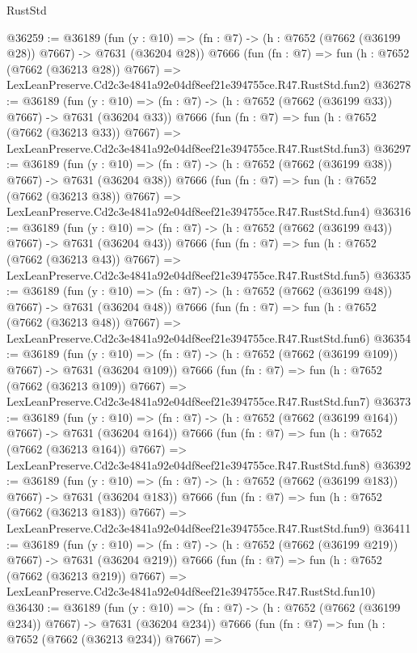 \begin{lexlean}{RustStd}
\begin{coremodule}
@36259 := @36189
    (fun (y : @10) => (fn : @7) -> (h : @7652 (@7662 (@36199 @28)) @7667) -> @7631 (@36204 @28))
    @7666
    (fun (fn : @7) =>
    fun (h : @7652 (@7662 (@36213 @28)) @7667) =>
    LexLeanPreserve.Cd2c3e4841a92e04df8eef21e394755ce.R47.RustStd.fun2)
@36278 := @36189
    (fun (y : @10) => (fn : @7) -> (h : @7652 (@7662 (@36199 @33)) @7667) -> @7631 (@36204 @33))
    @7666
    (fun (fn : @7) =>
    fun (h : @7652 (@7662 (@36213 @33)) @7667) =>
    LexLeanPreserve.Cd2c3e4841a92e04df8eef21e394755ce.R47.RustStd.fun3)
@36297 := @36189
    (fun (y : @10) => (fn : @7) -> (h : @7652 (@7662 (@36199 @38)) @7667) -> @7631 (@36204 @38))
    @7666
    (fun (fn : @7) =>
    fun (h : @7652 (@7662 (@36213 @38)) @7667) =>
    LexLeanPreserve.Cd2c3e4841a92e04df8eef21e394755ce.R47.RustStd.fun4)
@36316 := @36189
    (fun (y : @10) => (fn : @7) -> (h : @7652 (@7662 (@36199 @43)) @7667) -> @7631 (@36204 @43))
    @7666
    (fun (fn : @7) =>
    fun (h : @7652 (@7662 (@36213 @43)) @7667) =>
    LexLeanPreserve.Cd2c3e4841a92e04df8eef21e394755ce.R47.RustStd.fun5)
@36335 := @36189
    (fun (y : @10) => (fn : @7) -> (h : @7652 (@7662 (@36199 @48)) @7667) -> @7631 (@36204 @48))
    @7666
    (fun (fn : @7) =>
    fun (h : @7652 (@7662 (@36213 @48)) @7667) =>
    LexLeanPreserve.Cd2c3e4841a92e04df8eef21e394755ce.R47.RustStd.fun6)
@36354 := @36189
    (fun (y : @10) => (fn : @7) -> (h : @7652 (@7662 (@36199 @109)) @7667) -> @7631 (@36204 @109))
    @7666
    (fun (fn : @7) =>
    fun (h : @7652 (@7662 (@36213 @109)) @7667) =>
    LexLeanPreserve.Cd2c3e4841a92e04df8eef21e394755ce.R47.RustStd.fun7)
@36373 := @36189
    (fun (y : @10) => (fn : @7) -> (h : @7652 (@7662 (@36199 @164)) @7667) -> @7631 (@36204 @164))
    @7666
    (fun (fn : @7) =>
    fun (h : @7652 (@7662 (@36213 @164)) @7667) =>
    LexLeanPreserve.Cd2c3e4841a92e04df8eef21e394755ce.R47.RustStd.fun8)
@36392 := @36189
    (fun (y : @10) => (fn : @7) -> (h : @7652 (@7662 (@36199 @183)) @7667) -> @7631 (@36204 @183))
    @7666
    (fun (fn : @7) =>
    fun (h : @7652 (@7662 (@36213 @183)) @7667) =>
    LexLeanPreserve.Cd2c3e4841a92e04df8eef21e394755ce.R47.RustStd.fun9)
@36411 := @36189
    (fun (y : @10) => (fn : @7) -> (h : @7652 (@7662 (@36199 @219)) @7667) -> @7631 (@36204 @219))
    @7666
    (fun (fn : @7) =>
    fun (h : @7652 (@7662 (@36213 @219)) @7667) =>
    LexLeanPreserve.Cd2c3e4841a92e04df8eef21e394755ce.R47.RustStd.fun10)
@36430 := @36189
    (fun (y : @10) => (fn : @7) -> (h : @7652 (@7662 (@36199 @234)) @7667) -> @7631 (@36204 @234))
    @7666
    (fun (fn : @7) =>
    fun (h : @7652 (@7662 (@36213 @234)) @7667) =>

\end{coremodule}
\end{lexlean}
